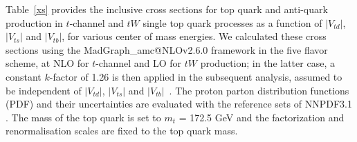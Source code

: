 \documentclass[11pt]{article}
\newcommand{\VTD}{|V_{td}|}
\newcommand{\VTS}{|V_{ts}|}
\newcommand{\VTB}{|V_{tb}|}
\begin{document}
Table~\ref{xs} provides the inclusive cross sections for top quark and anti-quark production in $t$-channel and $tW$ single top quark processes as a function of $\VTD$, $\VTS$ and $\VTB$, for various center of mass energies.
We calculated these cross sections using the {\sc MadGraph\_}a{\sc mc@NLO}v2.6.0 framework \cite{Alwall:2014hca} in the five flavor scheme, at NLO for $t$-channel and LO for $tW$ production; in the latter case, a constant $k$-factor of 1.26 is then applied in the subsequent analysis, assumed to be independent of $\VTD$, $\VTS$ and $\VTB$~\cite{Kidonakis:2015nna}.
The proton parton distribution functions (PDF) and their uncertainties are evaluated with the reference sets of NNPDF3.1 \cite{Ball:2014uwa}. The mass of the top quark is set to
$m_t$ = 172.5 GeV and the factorization and renormalisation scales are fixed to the top quark mass.
\end{document}
